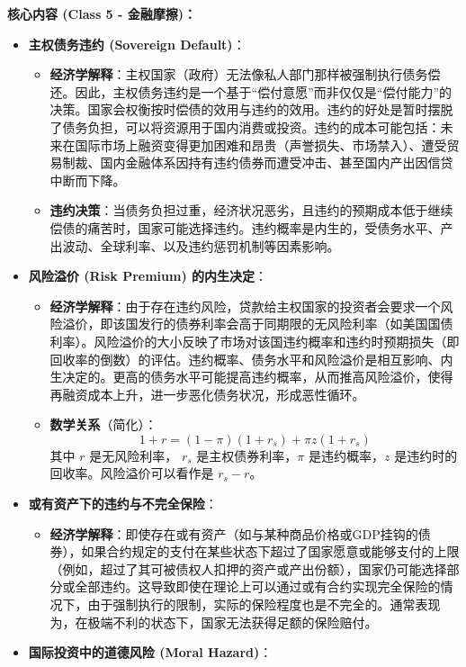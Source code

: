 \documentclass[12pt]{article}
\begin{document}
\textbf{核心内容 (Class 5 - 金融摩擦)：}
\begin{itemize}
    \item \textbf{主权债务违约 (Sovereign Default)}：
    \begin{itemize}
        \item \textbf{经济学解释}：主权国家（政府）无法像私人部门那样被强制执行债务偿还。因此，主权债务违约是一个基于“偿付意愿”而非仅仅是“偿付能力”的决策。国家会权衡按时偿债的效用与违约的效用。违约的好处是暂时摆脱了债务负担，可以将资源用于国内消费或投资。违约的成本可能包括：未来在国际市场上融资变得更加困难和昂贵（声誉损失、市场禁入）、遭受贸易制裁、国内金融体系因持有违约债券而遭受冲击、甚至国内产出因信贷中断而下降。
        \item \textbf{违约决策}：当债务负担过重，经济状况恶劣，且违约的预期成本低于继续偿债的痛苦时，国家可能选择违约。违约概率是内生的，受债务水平、产出波动、全球利率、以及违约惩罚机制等因素影响。
    \end{itemize}
    \item \textbf{风险溢价 (Risk Premium) 的内生决定}：
    \begin{itemize}
        \item \textbf{经济学解释}：由于存在违约风险，贷款给主权国家的投资者会要求一个风险溢价，即该国发行的债券利率会高于同期限的无风险利率（如美国国债利率）。风险溢价的大小反映了市场对该国违约概率和违约时预期损失（即回收率的倒数）的评估。违约概率、债务水平和风险溢价是相互影响、内生决定的。更高的债务水平可能提高违约概率，从而推高风险溢价，使得再融资成本上升，进一步恶化债务状况，形成恶性循环。
        \item \textbf{数学关系}（简化）：
        \[
        1+r = (1-\pi)(1+r_s) + \pi z (1+r_s)
        \]
        其中 $r$ 是无风险利率， $r_s$ 是主权债券利率，$\pi$ 是违约概率，$z$ 是违约时的回收率。风险溢价可以看作是 $r_s - r$。
    \end{itemize}
    \item \textbf{或有资产下的违约与不完全保险}：
    \begin{itemize}
        \item \textbf{经济学解释}：即使存在或有资产（如与某种商品价格或GDP挂钩的债券），如果合约规定的支付在某些状态下超过了国家愿意或能够支付的上限（例如，超过了其可被债权人扣押的资产或产出份额），国家仍可能选择部分或全部违约。这导致即使在理论上可以通过或有合约实现完全保险的情况下，由于强制执行的限制，实际的保险程度也是不完全的。通常表现为，在极端不利的状态下，国家无法获得足额的保险赔付。
    \end{itemize}
    \item \textbf{国际投资中的道德风险 (Moral Hazard)}：

\end{itemize}
\end{document}
